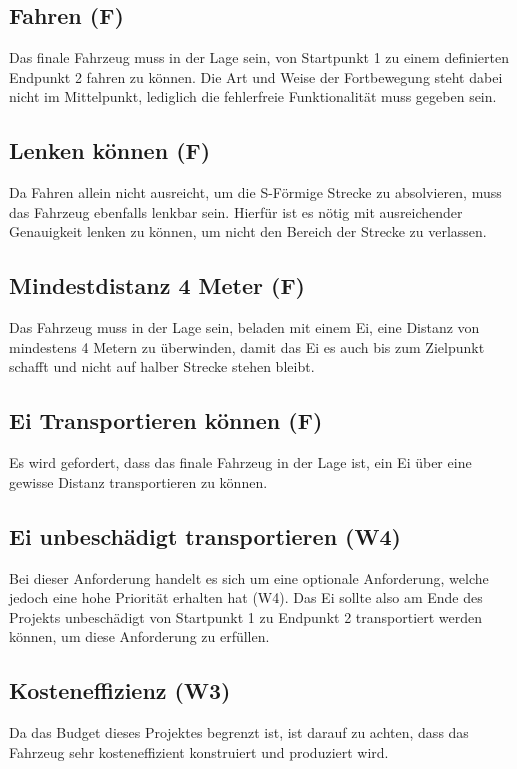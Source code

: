 \subsection*{Fahren (F)}
Das finale Fahrzeug muss in der Lage sein, von Startpunkt 1 zu einem definierten Endpunkt 2 fahren zu können. Die Art und Weise der Fortbewegung steht dabei nicht im Mittelpunkt, lediglich die fehlerfreie Funktionalität muss gegeben sein.

\subsection*{Lenken können (F)}
Da Fahren allein nicht ausreicht, um die S-Förmige Strecke zu absolvieren, muss das Fahrzeug ebenfalls lenkbar sein. Hierfür ist es nötig mit ausreichender Genauigkeit lenken zu können, um nicht den Bereich der Strecke zu verlassen.

\subsection*{Mindestdistanz 4 Meter (F)}
Das Fahrzeug muss in der Lage sein, beladen mit einem Ei, eine Distanz von mindestens 4 Metern zu überwinden, damit das Ei es auch bis zum Zielpunkt schafft und nicht auf halber Strecke stehen bleibt.

\subsection*{Ei Transportieren können (F)}
Es wird gefordert, dass das finale Fahrzeug in der Lage ist, ein Ei über eine gewisse Distanz transportieren zu können.

\subsection*{Ei unbeschädigt transportieren (W4)}
Bei dieser Anforderung handelt es sich um eine optionale Anforderung, welche jedoch eine hohe Priorität erhalten hat (W4). Das Ei sollte also am Ende des Projekts unbeschädigt von Startpunkt 1 zu Endpunkt 2 transportiert werden können, um diese Anforderung zu erfüllen.

\subsection*{Kosteneffizienz (W3)}
Da das Budget dieses Projektes begrenzt ist, ist darauf zu achten, dass das Fahrzeug sehr kosteneffizient konstruiert und produziert wird.

